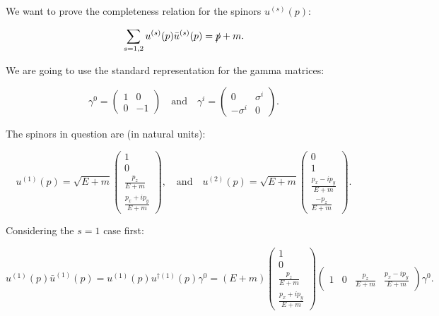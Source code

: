 \section{}

We want to prove the completeness relation for the spinors $u^{(s)}(p)$:

\begin{equation}
    \sum_{s=1,2}u^{(s)}(p)\bar{u}^{(s)}(p) = \slashed{p} + m.
\end{equation}

We are going to use the standard representation for the gamma matrices:

\begin{equation}
    \gamma^0 = \begin{pmatrix}1 & 0 \\ 0 & -1\end{pmatrix} \quad \mathrm{and} \quad \gamma^i = \begin{pmatrix}0 & \sigma^i \\ -\sigma^i & 0\end{pmatrix}.
\end{equation}

The spinors in question are (in natural units):

\begin{equation}
    u^{(1)}(p) = \sqrt{E + m}\begin{pmatrix}1 \\ 0 \\ \frac{p_z}{E+m} \\ \frac{p_x + ip_y}{E+m}\end{pmatrix}, \quad\mathrm{and}\quad u^{(2)}(p) = \sqrt{E + m}\begin{pmatrix}0 \\ 1 \\ \frac{p_x - ip_y}{E+m} \\ \frac{-p_z}{E+m}\end{pmatrix}.
\end{equation}

Considering the $s=1$ case first:

\begin{equation*}
    u^{(1)}(p)\bar{u}^{(1)}(p) = u^{(1)}(p)u^{\dagger(1)}(p)\gamma^0 = (E+m)\begin{pmatrix}1 \\ 0 \\ \frac{p_z}{E+m} \\ \frac{p_x + ip_y}{E+m}\end{pmatrix}\begin{pmatrix}1 & 0 & \frac{p_z}{E+m} & \frac{p_x - ip_y}{E+m}\end{pmatrix} \gamma^0.
\end{equation*}

